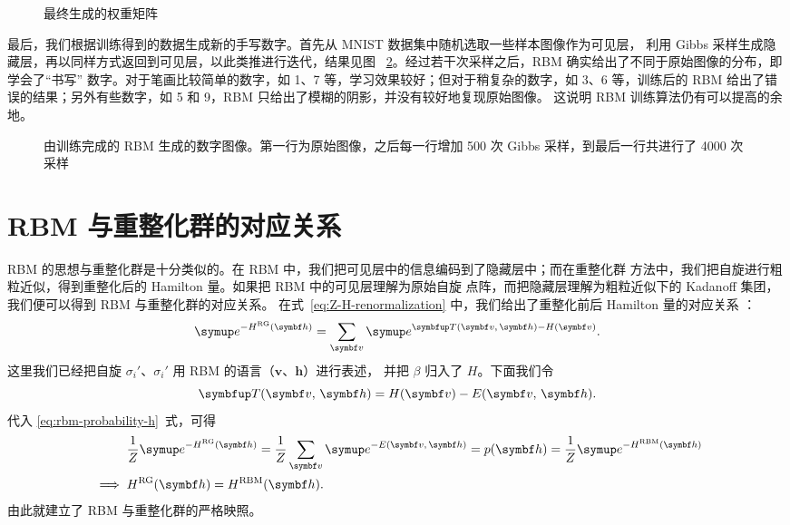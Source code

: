\begin{figure}[htb]
  \centering
  \caption{最终生成的权重矩阵}
  \label{fig:mnist-weight}
\end{figure}

最后，我们根据训练得到的数据生成新的手写数字。首先从 MNIST 数据集中随机选取一些样本图像作为可见层，
利用 Gibbs 采样生成隐藏层，再以同样方式返回到可见层，以此类推进行迭代，结果见图~%
\ref{fig:mnist-samples}。经过若干次采样之后，RBM 确实给出了不同于原始图像的分布，即学会了“书写”
数字。对于笔画比较简单的数字，如 1、7 等，学习效果较好；但对于稍复杂的数字，如 3、6 等，训练后的
RBM 给出了错误的结果；另外有些数字，如 5 和 9，RBM 只给出了模糊的阴影，并没有较好地复现原始图像。
这说明 RBM 训练算法仍有可以提高的余地。

\begin{figure}[htb]
  \centering
  \caption{由训练完成的 RBM 生成的数字图像。第一行为原始图像，之后每一行增加 \num{500} 次 Gibbs
    采样，到最后一行共进行了 \num{4000} 次采样}
  \label{fig:mnist-samples}
\end{figure}

\section{RBM 与重整化群的对应关系}

RBM 的思想与重整化群是十分类似的。在 RBM 中，我们把可见层中的信息编码到了隐藏层中；而在重整化群
方法中，我们把自旋进行粗粒近似，得到重整化后的 Hamilton 量。如果把 RBM 中的可见层理解为原始自旋
点阵，而把隐藏层理解为粗粒近似下的 Kadanoff 集团，我们便可以得到 RBM 与重整化群的对应关系。
在式~\eqref{eq:Z-H-renormalization} 中，我们给出了重整化前后 Hamilton 量的对应关系 \cite{exact}：
\begin{equation}
    \ee^{-H^{\text{RG}}(\bm{h})}
  = \sum_{\bm{v}} \ee^{\opT(\bm{v},\,\bm{h})-H(\bm{v})}.
\end{equation}
这里我们已经把自旋 $\sigma_i'$、$\sigma_i'$ 用 RBM 的语言（$\bm{v}$、$\bm{h}$）进行表述，
并把 $\beta$ 归入了 $H$。下面我们令
\begin{equation}
  \opT(\bm{v},\,\bm{h}) = H(\bm{v}) - E(\bm{v},\,\bm{h}).
\end{equation}
代入 \eqref{eq:rbm-probability-h}~式，可得
\begin{align}
  &\mathrel{\phantom{\implies}}
    \frac{1}{Z} \ee^{-H^{\text{RG}}(\bm{h})}
  = \frac{1}{Z} \sum_{\bm{v}} \ee^{-E(\bm{v},\,\bm{h})}
  = p(\bm{h})
  = \frac{1}{Z} \ee^{-H^{\text{RBM}}(\bm{h})} \notag \\
  &\implies H^{\text{RG}}(\bm{h}) = H^{\text{RBM}}(\bm{h}).
\end{align}
由此就建立了 RBM 与重整化群的严格映照。

